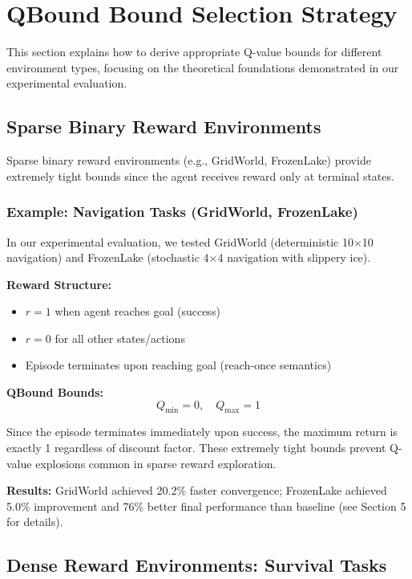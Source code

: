 \documentclass[11pt]{article}
\theoremstyle{definition}
\theoremstyle{remark}
\begin{document}
\section{QBound Bound Selection Strategy}

This section explains how to derive appropriate Q-value bounds for different environment types, focusing on the theoretical foundations demonstrated in our experimental evaluation.

\subsection{Sparse Binary Reward Environments}

Sparse binary reward environments (e.g., GridWorld, FrozenLake) provide extremely tight bounds since the agent receives reward only at terminal states.

\subsubsection{Example: Navigation Tasks (GridWorld, FrozenLake)}

In our experimental evaluation, we tested GridWorld (deterministic 10×10 navigation) and FrozenLake (stochastic 4×4 navigation with slippery ice).

\textbf{Reward Structure:}
\begin{itemize}
    \item $r = 1$ when agent reaches goal (success)
    \item $r = 0$ for all other states/actions
    \item Episode terminates upon reaching goal (reach-once semantics)
\end{itemize}

\textbf{QBound Bounds:}
$$Q_{\min} = 0, \quad Q_{\max} = 1$$

Since the episode terminates immediately upon success, the maximum return is exactly 1 regardless of discount factor. These extremely tight bounds prevent Q-value explosions common in sparse reward exploration.

\textbf{Results:} GridWorld achieved 20.2\% faster convergence; FrozenLake achieved 5.0\% improvement and 76\% better final performance than baseline (see Section 5 for details).

\subsection{Dense Reward Environments: Survival Tasks}
\end{document}
